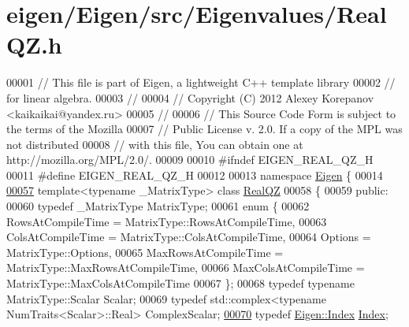\hypertarget{eigen_2_eigen_2src_2_eigenvalues_2_real_q_z_8h_source}{}\section{eigen/\+Eigen/src/\+Eigenvalues/\+Real\+QZ.h}
\label{eigen_2_eigen_2src_2_eigenvalues_2_real_q_z_8h_source}

\begin{DoxyCode}
00001 \textcolor{comment}{// This file is part of Eigen, a lightweight C++ template library}
00002 \textcolor{comment}{// for linear algebra.}
00003 \textcolor{comment}{//}
00004 \textcolor{comment}{// Copyright (C) 2012 Alexey Korepanov <kaikaikai@yandex.ru>}
00005 \textcolor{comment}{//}
00006 \textcolor{comment}{// This Source Code Form is subject to the terms of the Mozilla}
00007 \textcolor{comment}{// Public License v. 2.0. If a copy of the MPL was not distributed}
00008 \textcolor{comment}{// with this file, You can obtain one at http://mozilla.org/MPL/2.0/.}
00009 
00010 \textcolor{preprocessor}{#ifndef EIGEN\_REAL\_QZ\_H}
00011 \textcolor{preprocessor}{#define EIGEN\_REAL\_QZ\_H}
00012 
00013 \textcolor{keyword}{namespace }\hyperlink{namespace_eigen}{Eigen} \{
00014 
\hyperlink{group___eigenvalues___module}{00057}   \textcolor{keyword}{template}<\textcolor{keyword}{typename} \_MatrixType> \textcolor{keyword}{class }\hyperlink{group___eigenvalues___module_class_eigen_1_1_real_q_z}{RealQZ}
00058   \{
00059     \textcolor{keyword}{public}:
00060       \textcolor{keyword}{typedef} \_MatrixType MatrixType;
00061       \textcolor{keyword}{enum} \{
00062         RowsAtCompileTime = MatrixType::RowsAtCompileTime,
00063         ColsAtCompileTime = MatrixType::ColsAtCompileTime,
00064         Options = MatrixType::Options,
00065         MaxRowsAtCompileTime = MatrixType::MaxRowsAtCompileTime,
00066         MaxColsAtCompileTime = MatrixType::MaxColsAtCompileTime
00067       \};
00068       \textcolor{keyword}{typedef} \textcolor{keyword}{typename} MatrixType::Scalar Scalar;
00069       \textcolor{keyword}{typedef} std::complex<typename NumTraits<Scalar>::Real> ComplexScalar;
\hyperlink{group___eigenvalues___module_a6201e534e901b5f4e66f72c176b534a3}{00070}       \textcolor{keyword}{typedef} \hyperlink{namespace_eigen_a62e77e0933482dafde8fe197d9a2cfde}{Eigen::Index} \hyperlink{group___eigenvalues___module_a6201e534e901b5f4e66f72c176b534a3}{Index}; 

\end{DoxyCode}
